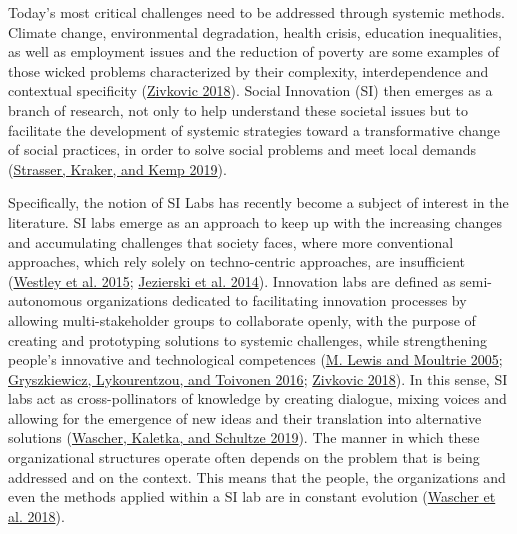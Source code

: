 \documentclass[AMA,STIX1COL,APA,STIX2COL]{WileyNJD-v2}
\begin{document}
Today's most critical challenges need to be addressed through systemic
methods. Climate change, environmental degradation, health crisis,
education inequalities, as well as employment issues and the reduction
of poverty are some examples of those wicked problems characterized by
their complexity, interdependence and contextual specificity
(\protect\hyperlink{ref-Zivkovic2018}{Zivkovic 2018}). Social Innovation
(SI) then emerges as a branch of research, not only to help understand
these societal issues but to facilitate the development of systemic
strategies toward a transformative change of social practices, in order
to solve social problems and meet local demands
(\protect\hyperlink{ref-Strasser2019}{Strasser, Kraker, and Kemp 2019}).

Specifically, the notion of SI Labs has recently become a subject of
interest in the literature. SI labs emerge as an approach to keep up
with the increasing changes and accumulating challenges that society
faces, where more conventional approaches, which rely solely on
techno-centric approaches, are insufficient
(\protect\hyperlink{ref-Westley2015}{Westley et al. 2015};
\protect\hyperlink{ref-Jezierski2014}{Jezierski et al. 2014}).
Innovation labs are defined as semi-autonomous organizations dedicated
to facilitating innovation processes by allowing multi-stakeholder
groups to collaborate openly, with the purpose of creating and
prototyping solutions to systemic challenges, while strengthening
people's innovative and technological competences
(\protect\hyperlink{ref-Lewis2005}{M. Lewis and Moultrie 2005};
\protect\hyperlink{ref-Gryszkiewicz2016}{Gryszkiewicz, Lykourentzou, and
Toivonen 2016}; \protect\hyperlink{ref-Zivkovic2018}{Zivkovic 2018}). In
this sense, SI labs act as cross-pollinators of knowledge by creating
dialogue, mixing voices and allowing for the emergence of new ideas and
their translation into alternative solutions
(\protect\hyperlink{ref-Wascher2019}{Wascher, Kaletka, and Schultze
2019}). The manner in which these organizational structures operate
often depends on the problem that is being addressed and on the context.
This means that the people, the organizations and even the methods
applied within a SI lab are in constant evolution
(\protect\hyperlink{ref-Wascher2018}{Wascher et al. 2018}).
\end{document}

